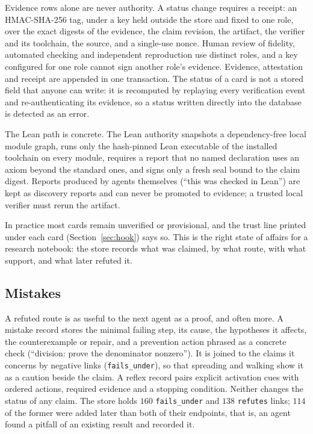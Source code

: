 Evidence rows alone are never authority. A status change requires a receipt: an HMAC-SHA-256 tag, under a key held outside the store and fixed to one role, over the exact digests of the evidence, the claim revision, the artifact, the verifier and its toolchain, the source, and a single-use nonce. Human review of fidelity, automated checking and independent reproduction use distinct roles, and a key configured for one role cannot sign another role's evidence. Evidence, attestation and receipt are appended in one transaction. The status of a card is not a stored field that anyone can write: it is recomputed by replaying every verification event and re-authenticating its evidence, so a status written directly into the database is detected as an error.

The Lean path is concrete. The Lean authority snapshots a dependency-free local module graph, runs only the hash-pinned Lean executable of the installed toolchain on every module, requires a report that no named declaration uses an axiom beyond the standard ones, and signs only a fresh seal bound to the claim digest. Reports produced by agents themselves (``this was checked in Lean'') are kept as discovery reports and can never be promoted to evidence; a trusted local verifier must rerun the artifact.

In practice most cards remain \textsf{unverified} or \textsf{provisional}, and the trust line printed under each card (Section~\ref{sec:hook}) says so. This is the right state of affairs for a research notebook: the store records what was claimed, by what route, with what support, and what later refuted it.

\subsection{Mistakes}
A refuted route is as useful to the next agent as a proof, and often more. A mistake record stores the minimal failing step, its cause, the hypotheses it affects, the counterexample or repair, and a prevention action phrased as a concrete check (``division: prove the denominator nonzero''). It is joined to the claims it concerns by negative links (\texttt{fails\_under}), so that spreading and walking show it as a caution beside the claim. A reflex record pairs explicit activation cues with ordered actions, required evidence and a stopping condition. Neither changes the status of any claim. The store holds $160$ \texttt{fails\_under} and $138$ \texttt{refutes} links; $114$ of the former were added later than both of their endpoints, that is, an agent found a pitfall of an existing result and recorded it.

